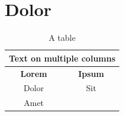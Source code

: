     \lipsum[4]

\section{Dolor}\label{sec:dolor}

    \lipsum[3]

    \begin{table}[h]
        \centering
        \begin{center}
            \begin{tabular}{|c||c|}
                \hline
                \multicolumn{2}{|c|}{Text on multiple columns} \\
                \hline
                \textbf{Lorem} & \textbf{Ipsum} \\
                \hline
                \hline
                Dolor & Sit \\
                \hline
                Amet &  \\
                \hline
            \end{tabular}
        \end{center}
        \caption{A table}
        \label{tab:example}
    \end{table}

    \lipsum[4-5]
